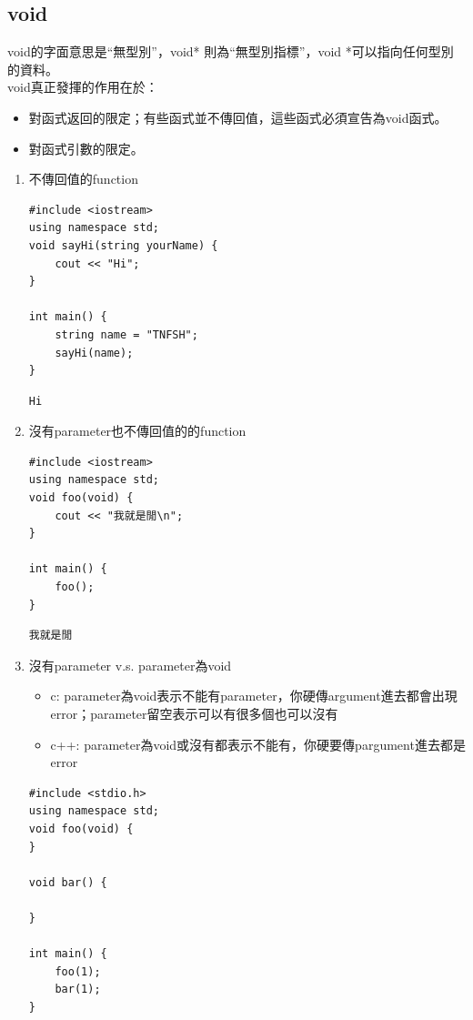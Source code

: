 \documentclass[a4paper,12pt]{article}
\begin{document}
\subsection{void}
\label{sec:orgbd5b029}
void的字面意思是“無型別”，void* 則為“無型別指標”，void *可以指向任何型別的資料。\\
void真正發揮的作用在於：\\
\begin{itemize}
\item 對函式返回的限定；有些函式並不傳回值，這些函式必須宣告為void函式。\\
\item 對函式引數的限定。\\
\end{itemize}
\begin{enumerate}
\item 不傳回值的function
\label{sec:org01bcd22}
\lstset{breaklines=true,language=cpp,label= ,caption= ,captionpos=b,firstnumber=1,numbers=left}
\begin{lstlisting}
#include <iostream>
using namespace std;
void sayHi(string yourName) {
    cout << "Hi";
}

int main() {
    string name = "TNFSH";
    sayHi(name);
}
\end{lstlisting}

\begin{verbatim}
Hi
\end{verbatim}
\item 沒有parameter也不傳回值的的function
\label{sec:org0ba38ad}
\lstset{breaklines=true,language=cpp,label= ,caption= ,captionpos=b,firstnumber=1,numbers=left}
\begin{lstlisting}
#include <iostream>
using namespace std;
void foo(void) {
    cout << "我就是閒\n";
}

int main() {
    foo();
}
\end{lstlisting}

\begin{verbatim}
我就是閒
\end{verbatim}
\item 沒有parameter v.s. parameter為void
\label{sec:org0e55fea}
\begin{itemize}
\item c: parameter為void表示不能有parameter，你硬傳argument進去都會出現error；parameter留空表示可以有很多個也可以沒有\\
\item c++: parameter為void或沒有都表示不能有，你硬要傳pargument進去都是error\\
\end{itemize}
\lstset{breaklines=true,language=cpp,label= ,caption= ,captionpos=b,firstnumber=1,numbers=left}
\begin{lstlisting}
#include <stdio.h>
using namespace std;
void foo(void) {
}

void bar() {

}

int main() {
    foo(1);
    bar(1);
}
\end{lstlisting}
\end{enumerate}
\end{document}

